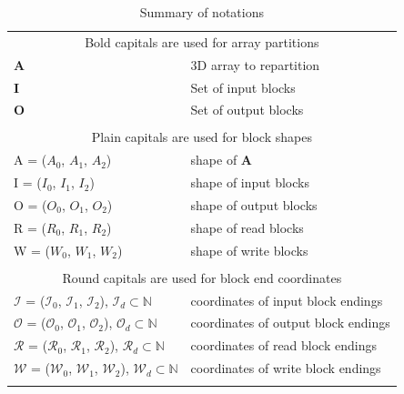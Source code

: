 \documentclass[sigconf, nonacm]{acmart}
\begin{document}
\begin{table}
  \begin{tabular}{ll}
    \multicolumn{2}{c}{\cellcolor{black!25}Bold capitals are used for array partitions}\\
    \textbf{A} & 3D array to repartition \\
    \textbf{I} & Set of input blocks \\
    \textbf{O} & Set of output blocks \\
    &\\
    \multicolumn{2}{c}{\cellcolor{black!25}Plain capitals are used for block shapes}\\
    A = ($A_0$, $A_1$, $A_2$) & shape of \textbf{A}\\
    I = ($I_0$, $I_1$, $I_2$)& shape of input blocks\\
    O = ($O_0$, $O_1$, $O_2$) & shape of output blocks\\
    R = ($R_0$, $R_1$, $R_2$) & shape of read blocks\\
    W = ($W_0$, $W_1$, $W_2$) & shape of write blocks\\
    &\\
    \multicolumn{2}{c}{\cellcolor{black!25}Round capitals are used for block end coordinates}\\

    $\mathcal{I}$ = ($\mathcal{I}_0$, $\mathcal{I}_1$, $\mathcal{I}_2$), \enskip $\mathcal{I}_d \subset \mathbb{N} $ & coordinates of input block endings \\
    $\mathcal{O}$ = ($\mathcal{O}_0$, $\mathcal{O}_1$, $\mathcal{O}_2$), \enskip $\mathcal{O}_d \subset \mathbb{N} $ & coordinates of output block endings\\
    $\mathcal{R}$ = ($\mathcal{R}_0$, $\mathcal{R}_1$, $\mathcal{R}_2$), \enskip $\mathcal{R}_d \subset \mathbb{N} $ & coordinates of read block endings\\
    $\mathcal{W}$ = ($\mathcal{W}_0$, $\mathcal{W}_1$, $\mathcal{W}_2$), \enskip $\mathcal{W}_d \subset \mathbb{N} $ & coordinates of write block endings\\
    &
  \end{tabular}
  \caption{Summary of notations}
\end{table}


\end{document}
